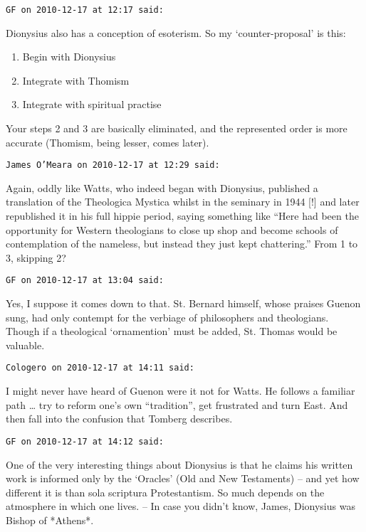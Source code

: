 \begin{footnotesize}
\begin{sffamily}
\hfill

\texttt{GF on 2010-12-17 at 12:17 said: }

Dionysius also has a conception of esoterism. So my `counter-proposal' is this:

\begin{enumerate}
\item Begin with Dionysius

\item Integrate with Thomism

\item Integrate with spiritual practise
\end{enumerate}

Your steps 2 and 3 are basically eliminated, and the represented order is more accurate (Thomism, being lesser, comes later).


\hfill

\texttt{James O'Meara on 2010-12-17 at 12:29 said: }

Again, oddly like Watts, who indeed began with Dionysius, published a translation of the Theologica Mystica whilst in the seminary in 1944 [!] and later republished it in his full hippie period, saying something like “Here had been the opportunity for Western theologians to close up shop and become schools of contemplation of the nameless, but instead they just kept chattering.” From 1 to 3, skipping 2?


\hfill

\texttt{GF on 2010-12-17 at 13:04 said: }

Yes, I suppose it comes down to that. St. Bernard himself, whose praises Guenon sung, had only contempt for the verbiage of philosophers and theologians. Though if a theological `ornamention' must be added, St. Thomas would be valuable.


\hfill

\texttt{Cologero on 2010-12-17 at 14:11 said: }

I might never have heard of Guenon were it not for Watts. He follows a familiar path … try to reform one's own “tradition”, get frustrated and turn East. And then fall into the confusion that Tomberg describes.


\hfill

\texttt{GF on 2010-12-17 at 14:12 said: }

One of the very interesting things about Dionysius is that he claims his written work is informed only by the `Oracles’ (Old and New Testaments) – and yet how different it is than sola scriptura Protestantism. So much depends on the atmosphere in which one lives. – In case you didn't know, James, Dionysius was Bishop of *Athens*.



\end{sffamily}
\end{footnotesize}
